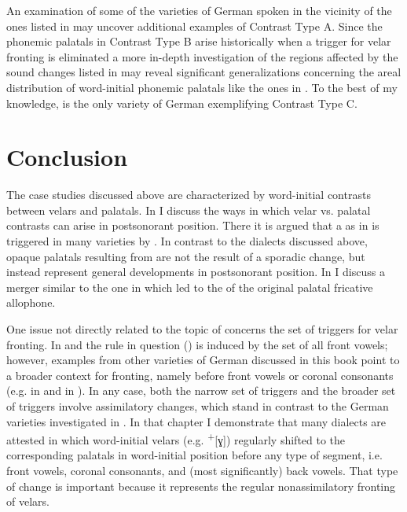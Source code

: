 \clearpage An examination of some of the varieties of German spoken in the vicinity of the ones listed in  may uncover additional examples of Contrast Type A. Since the phonemic palatals in Contrast Type B arise historically when a trigger for velar fronting is eliminated a more in-depth investigation of the regions affected by the sound changes listed in  may reveal significant generalizations concerning the areal distribution of word-initial phonemic palatals like the ones in . To the best of my knowledge,  is the only variety of German exemplifying Contrast Type C.

\section{Conclusion}\label{sec:8.8}

The case studies discussed above are characterized by word-initial contrasts between velars and palatals. In  I discuss the ways in which velar vs. palatal contrasts can arise in postsonorant position. There it is argued that a  as in  is triggered in many varieties by . In contrast to the dialects discussed above, opaque palatals resulting from  are not the result of a sporadic change, but instead represent general developments in postsonorant position. In  I discuss a merger similar to the one in  which led to the  of the original palatal fricative allophone.

One issue not directly related to the topic of  concerns the set of triggers for velar fronting. In  and  the rule in question () is induced by the set of all front vowels; however, examples from other varieties of German discussed in this book point to a broader context for fronting, namely before front vowels or coronal consonants (e.g.  in  and  in ). In any case, both the narrow set of triggers and the broader set of triggers involve assimilatory changes, which stand in contrast to the German varieties investigated in . In that chapter I demonstrate that many dialects are attested in which word-initial velars (e.g.  \textsuperscript{+}[ɣ]) regularly shifted to the corresponding palatals in word-initial position before any type of segment, i.e. front vowels, coronal consonants, and (most significantly) back vowels. That type of change is important because it represents the regular nonassimilatory fronting of velars.
